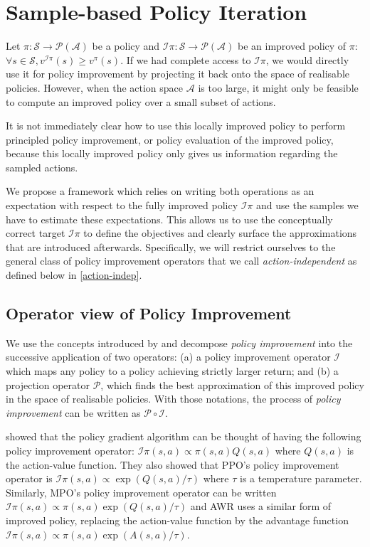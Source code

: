 \documentclass{article}
\newcommand{\ipi}{\mathcal{I}\pi}
\begin{document}
\section{Sample-based Policy Iteration}
\label{sample-based-policy-improvement}
Let $\pi: \mathcal{S}\to\mathcal{P}(\mathcal{A})$ be a policy and $\ipi: \mathcal{S}\to\mathcal{P}(\mathcal{A})$ be an improved policy of $\pi$: $\forall s\in\mathcal{S}, v^{\ipi}(s) \geq v^\pi(s)$. If we had complete access to $\ipi$, we would directly use it for policy improvement by projecting it back onto the space of realisable policies. However, when the action space $\mathcal{A}$ is too large, it might only be feasible to compute an improved policy over a small subset of actions.

It is not immediately clear how to use this locally improved policy to perform principled policy improvement, or policy evaluation of the improved policy, because this locally improved policy only gives us information regarding the sampled actions.

We propose a framework which relies on writing both operations as an expectation with respect to the fully improved policy $\ipi$ and use the samples we have to estimate these expectations. This allows us to use the conceptually correct target $\ipi$ to define the objectives and clearly surface the approximations that are introduced afterwards. Specifically, we will restrict ourselves to the general class of policy improvement operators that we call \emph{action-independent} as defined below in \ref{action-indep}.

\subsection{Operator view of Policy Improvement}
\label{operator-view}
We use the concepts introduced by \cite{ghosh2020operator} and decompose \emph{policy improvement} into the successive application of two operators: (a) a policy improvement operator $\mathcal{I}$ which maps any policy to a policy achieving strictly larger return; and (b) a projection operator $\mathcal{P}$, which finds the best approximation of this improved policy in the space of realisable policies. With those notations, the process of \emph{policy improvement} can be written as $\mathcal{P}\circ\mathcal{I}$.

\cite{ghosh2020operator} showed that the policy gradient algorithm can be thought of having the following policy improvement operator: $\ipi(s, a)\propto\pi(s, a) Q(s, a)$ where $Q(s, a)$ is the action-value function. They also showed that PPO's \cite{schulman2017proximal} policy improvement operator is $\ipi(s, a)\propto\exp(Q(s, a)/\tau)$ where $\tau$ is a temperature parameter. Similarly, MPO's \cite{mpo} policy improvement operator can be written $\ipi(s, a)\propto\pi(s, a) \exp(Q(s, a)/\tau)$ and AWR \cite{peng2019advantage} uses a similar form of improved policy, replacing the action-value function by the advantage function $\ipi(s, a)\propto\pi(s, a) \exp(A(s, a)/\tau)$.
\end{document}
